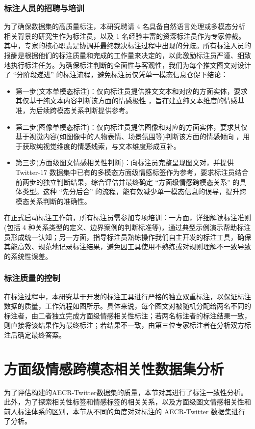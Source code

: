 \subsubsection{标注人员的招聘与培训}
为了确保数据集的高质量标注，本研究聘请 4 名具备自然语言处理或多模态分析相关背景的研究生作为标注员，以及 1 名经验丰富的资深标注员作为专家仲裁。其中，专家的核心职责是协调并最终裁决标注过程中出现的分歧。所有标注人员的报酬是根据他们的标注质量和完成的工作量来决定的，以此激励标注员严谨、细致地执行标注任务。为确保标注判断的全面性与客观性，我们为每个推文图文对设计了 “分阶段递进” 的标注流程，避免标注员仅凭单一模态信息仓促下结论：
\begin{itemize}
  \item 第一步(文本单模态标注)：仅向标注员提供推文文本和对应的方面实体，要求其仅基于纯文本内容判断该方面的情感极性 ，旨在建立纯文本维度的情感基准，为后续跨模态关系判断提供参考。
  \item 第二步(图像单模态标注)：仅向标注员提供图像和对应的方面实体，要求其仅基于视觉内容(如图像中的人物表情、场景氛围等)判断该方面的情感倾向 ，用于获取纯视觉维度的情感线索，与文本维度形成互补。
  \item 第三步(方面级图文情感相关性判断)：向标注员完整呈现图文对，并提供 Twitter-17 数据集中已有的多模态方面级情感标签作为参考，要求标注员结合前两步的独立判断结果，综合评估并最终确定 “方面级情感跨模态关系” 的具体类型。这种 “先分后合” 的流程，能有效减少单一模态信息的误导，提升跨模态关系判断的准确性。
\end{itemize}

在正式启动标注工作前，所有标注员需参加专项培训：一方面，详细解读标注准则(包括 4 种关系类型的定义、边界案例的判断标准等)，通过典型示例演示帮助标注员形成统一认知；另一方面，指导标注员熟练操作我们自主开发的标注工具，确保其能高效、规范地记录标注结果，避免因工具使用不熟练或对规则理解不一致导致的系统性误差。

\subsubsection{标注质量的控制}
在标注过程中，本研究基于开发的标注工具进行严格的独立双重标注，以保证标注数据的质量，工作流程如图所示。具体来说，每个图文对被随机分配给两名不同的标注者，由二者独立完成方面级情感相关性标注；若两名标注者的标注结果一致，则直接将该结果作为最终标注；若结果不一致，由第三位专家标注者在分析双方标注后确定最终答案。
 


\section{方面级情感跨模态相关性数据集分析}
为了评估构建的AECR-Twitter数据集的质量，本节对其进行了标注一致性分析。此外，为了探索相关性标签和情感标签的相关关系，以及方面级图文情感相关性和前人标注体系的区别，本节从不同的角度对对标注的 AECR-Twitter 数据集进行了分析。


